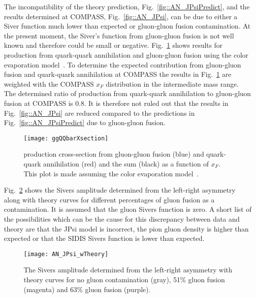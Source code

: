The incompatibility of the theory prediction, Fig.~\ref{fig::AN_JPsiPredict},
and the results determined at COMPASS, Fig.~\ref{fig::AN_JPsi}, can be due to
either a Siver function much lower than expected or gluon-gluon fusion
contamination.  At the present moment, the Siver's function from gluon-gluon
fusion is not well known and therefore could be small or negative.
Fig.~\ref{fig::ggQQbarXsection} shows results for {\jp} production from
quark-quark annihilation and gluon-gluon fusion using the color evaporation
model~\cite{VOGT1999197}.  To determine the expected {\jp} contribution from
gluon-gluon fusion and quark-quark annihilation at COMPASS the results in
Fig.~\ref{fig::ggQQbarXsection} are weighted with the COMPASS $x_F$ distribution
in the intermediate mass range.  The determined ratio of {\jp} production from
quark-quark annihilation to gluon-gluon fusion at COMPASS is 0.8.  It is
therefore not ruled out that the results in Fig.~\ref{fig::AN_JPsi} are reduced
compared to the predictions in Fig.~\ref{fig::AN_JPsiPredict} due to gluon-gluon
fusion.

\begin{figure}[h!t]
  \centering \texttt{[image: ggQQbarXsection]}
  \caption{{\jp} production cross-section from gluon-gluon fusion (blue) and
    quark-quark annihilation (red) and the sum (black) as a function of $x_F$.
    This plot is made assuming the color evaporation model~\cite{VOGT1999197}. }
  \label{fig::ggQQbarXsection}
\end{figure}

Fig.~\ref{fig::AN_JPsi_wTheory} shows the Sivers amplitude determined from the
left-right asymmetry along with theory curves for different percentages of gluon
fusion as a contamination.  It is assumed that the gluon Sivers function is
zero.  A short list of the possibilities which can be the cause for this
discrepancy between data and theory are that the JPsi model is incorrect, the
pion gluon density is higher than expected or that the SIDIS Sivers function is
lower than expected.  

\begin{figure}[h!t]
  \centering
  \texttt{[image: AN\_JPsi\_wTheory]}
  \caption{The Sivers amplitude determined from the left-right asymmetry with
    theory curves for no gluon contamination (gray), 51\% gluon fusion (magenta)
    and 63\% gluon fusion (purple).}
  \label{fig::AN_JPsi_wTheory}
\end{figure}

